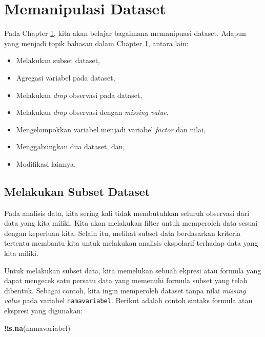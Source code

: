 \documentclass[12pt,]{krantz}
\newenvironment{Shaded}{\begin{snugshade}}{\end{snugshade}}
\newcommand{\KeywordTok}[1]{\textcolor[rgb]{0.13,0.29,0.53}{\textbf{#1}}}
\newcommand{\NormalTok}[1]{#1}
\newcommand{\OperatorTok}[1]{\textcolor[rgb]{0.81,0.36,0.00}{\textbf{#1}}}
\providecommand{\tightlist}{%
  \setlength{\itemsep}{0pt}\setlength{\parskip}{0pt}}
\begin{document}
\hypertarget{transdata}{%
\section{Memanipulasi Dataset}\label{transdata}}

Pada Chapter \ref{transdata}, kita akan belajar bagaimana memanipuasi dataset. Adapun yang menjadi topik bahasan dalam Chapter \ref{transdata}, antara lain:

\begin{itemize}
\tightlist
\item
  Melakukan subset dataset,
\item
  Agregasi variabel pada dataset,
\item
  Melakukan \emph{drop} observasi pada dataset,
\item
  Melakukan \emph{drop} observasi dengan \emph{missing value},
\item
  Mengelompokkan variabel menjadi variabel \emph{factor} dan nilai,
\item
  Menggabungkan dua dataset, dan,
\item
  Modifikasi lainnya.
\end{itemize}

\hypertarget{melakukan-subset-dataset}{%
\subsection{Melakukan Subset Dataset}\label{melakukan-subset-dataset}}

Pada analisis data, kita sering kali tidak membutuhkan seluruh observasi dari data yang kita miliki. Kita akan melakukan filter untuk memperoleh data sesuai dengan keperluan kita. Selain itu, melihat subset data berdasarkan kriteria tertentu membantu kita untuk melakukan analisis ekspolarif terhadap data yang kita miliki.

Untuk melakukan subset data, kita memelukan sebuah ekpresi atau formula yang dapat mengecek satu persatu data yang memenuhi formula subset yang telah dibentuk. Sebagai contoh, kita ingin memperoleh dataset tanpa nilai \emph{missing value} pada variabel \texttt{namavariabel}. Berikut adalah contoh sintaks formula atau ekspresi yang digunakan:

\begin{Shaded}
\begin{Highlighting}[]
\OperatorTok{!}\KeywordTok{is.na}\NormalTok{(namavariabel)}
\end{Highlighting}
\end{Shaded}
\end{document}
